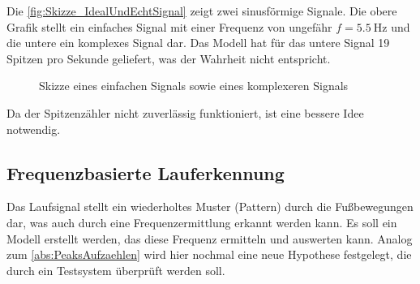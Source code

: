 Die \autoref{fig:Skizze_IdealUndEchtSignal} zeigt zwei sinusförmige Signale. Die obere Grafik stellt ein einfaches Signal mit einer Frequenz von ungefähr $f = \SI{5,5}{\hertz}$ und die untere ein komplexes Signal dar.
Das Modell hat für das untere Signal 19 Spitzen pro Sekunde geliefert, was der Wahrheit nicht entspricht.


\begin{figure}[htpb]
	\centering
	\hfill
	\caption{Skizze eines einfachen Signals sowie eines komplexeren Signals}
	\label{fig:Skizze_IdealUndEchtSignal}
\end{figure}

Da der Spitzenzähler nicht zuverlässig funktioniert, ist eine bessere Idee notwendig. 


\subsection{Frequenzbasierte Lauferkennung}

Das Laufsignal stellt ein wiederholtes Muster (Pattern) durch die Fußbewegungen dar, was auch durch eine Frequenzermittlung erkannt werden kann.
Es soll ein Modell erstellt werden, das diese Frequenz ermitteln und auswerten kann.
Analog zum \autoref{abs:PeaksAufzaehlen} wird hier nochmal eine neue Hypothese festgelegt, die durch ein Testsystem überprüft werden soll.

